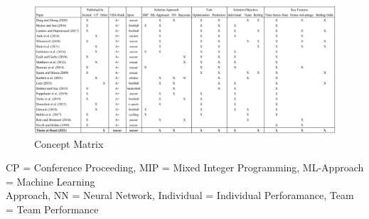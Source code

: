 \clearpage\pagestyle{empty} %
\begin{landscape} %
\begin{figure}[h]
    \caption{Concept Matrix}
    \centering
    \includegraphics[width=25cm]{chapter/literature_review/section/matrix.png}
\end{figure}
\footnotesize \noindent CP = Conference Proceeding, MIP = Mixed Integer Programming, ML-Approach = Machine Learning \\
Approach, NN = Neural Network, Individual = Individual Perforamance, Team = Team Performance 

\restoregeometry %

\end{landscape}
\pagestyle{scrheadings} %